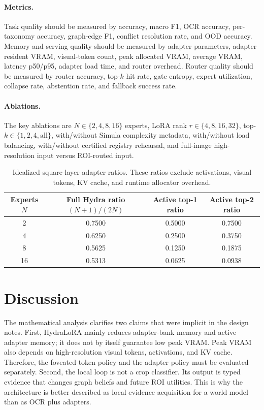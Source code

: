 \documentclass[11pt]{article}
\begin{document}
\paragraph{Metrics.}
Task quality should be measured by accuracy, macro F1, OCR accuracy, per-taxonomy accuracy, graph-edge F1, conflict resolution rate, and OOD accuracy.
Memory and serving quality should be measured by adapter parameters, adapter resident VRAM, visual-token count, peak allocated VRAM, average VRAM, latency p50/p95, adapter load time, and router overhead.
Router quality should be measured by router accuracy, top-$k$ hit rate, gate entropy, expert utilization, collapse rate, abstention rate, and fallback success rate.

\paragraph{Ablations.}
The key ablations are $N\in\{2,4,8,16\}$ experts, LoRA rank $r\in\{4,8,16,32\}$, top-$k\in\{1,2,4,\mathrm{all}\}$, with/without Simula complexity metadata, with/without load balancing, with/without certified registry rehearsal, and full-image high-resolution input versus ROI-routed input.

\begin{table}[t]
  \centering
  \caption{Idealized square-layer adapter ratios. These ratios exclude activations, visual tokens, KV cache, and runtime allocator overhead.}
  \label{tab:ratios}
  \begin{tabular}{cccc}
    \toprule
    Experts $N$ & Full Hydra ratio $(N+1)/(2N)$ & Active top-1 ratio & Active top-2 ratio \\
    \midrule
    2  & 0.7500 & 0.5000 & 0.7500 \\
    4  & 0.6250 & 0.2500 & 0.3750 \\
    8  & 0.5625 & 0.1250 & 0.1875 \\
    16 & 0.5313 & 0.0625 & 0.0938 \\
    \bottomrule
  \end{tabular}
\end{table}

\section{Discussion}

The mathematical analysis clarifies two claims that were implicit in the design notes.
First, HydraLoRA mainly reduces adapter-bank memory and active adapter memory; it does not by itself guarantee low peak VRAM.
Peak VRAM also depends on high-resolution visual tokens, activations, and KV cache.
Therefore, the foveated token policy and the adapter policy must be evaluated separately.
Second, the local loop is not a crop classifier.
Its output is typed evidence that changes graph beliefs and future ROI utilities.
This is why the architecture is better described as local evidence acquisition for a world model than as OCR plus adapters.
\end{document}
